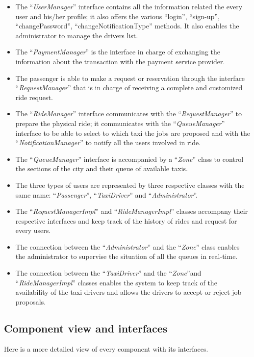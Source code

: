 \documentclass[a4paper,11pt]{report} %
\begin{document}
	\begin{itemize}
		\renewcommand{\labelitemi}{$\Rightarrow$}
		\item The ``\textit{UserManager}'' interface contains all the information related the every user and his/her profile; it also offers the various ``login'', ``sign-up'', ``changePassword'', ``changeNotificationType'' methods. It also enables the administrator to  manage the drivers list.
		\item The ``\textit{PaymentManager}'' is the interface in charge of exchanging the information about the transaction with the payment service provider.
		\item The passenger is able to make a request or reservation through the interface ``\textit{RequestManager}'' that is in charge of receiving a complete and customized ride request.
		\item The ``\textit{RideManager}'' interface communicates with the ``\textit{RequestManager}'' to prepare the physical ride; it communicates with the ``\textit{QueueManager}'' interface to be able to select to which taxi the jobs are proposed and with the ``\textit{NotificationManager}'' to notify all the users involved in ride.
		\item The ``\textit{QueueManager}'' interface is accompanied by a ``\textit{Zone}'' class to control the sections of the city and their queue of available taxis.
		\item The three types of users are represented by three respective classes with the same name: ``\textit{Passenger}'', ``\textit{TaxiDriver}'' and ``\textit{Administrator}''.
		\item The ``\textit{RequestManagerImpl}'' and ``\textit{RideManagerImpl}'' classes accompany their respective interfaces and keep track of the history of rides and request for every users.
		\item The connection between the ``\textit{Administrator}'' and the ``\textit{Zone}'' class enables the administrator to supervise the situation of all the queues in real-time.
		\item The connection between the ``\textit{TaxiDriver}'' and the ``\textit{Zone}''and  ``\textit{RideManagerImpl}'' classes enables the system to keep track of the availability of the taxi drivers and allows the drivers to accept or reject job proposals.
	\end{itemize}	
	
	\subsection{Component view and interfaces} Here is a more detailed view of every component with its interfaces.
	
\end{document}
